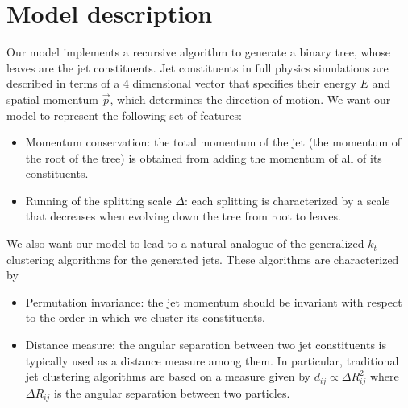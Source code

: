 \documentclass[12pt]{article}
\begin{document}
\vspace{0.6cm}
\section{Model description}

Our model implements a recursive algorithm to generate a binary tree, whose leaves are the jet constituents. Jet constituents in full physics simulations are described in terms of a 4 dimensional vector that specifies their energy $E$ and spatial momentum $\vec{p}$, which determines the direction of motion. 
We want our model to represent the following set of features:
\begin{itemize}
\item Momentum conservation: the total momentum of the jet (the momentum of the root of the tree) is obtained from adding the momentum of all of its constituents.

\item Running of the splitting scale $\Delta$: each splitting is characterized by a scale that decreases when evolving down the tree from root to leaves.





\end{itemize}

We also want our model to lead to a natural analogue of the generalized $k_t$ clustering algorithms for the generated jets. These algorithms are characterized by

\begin{itemize}
\item Permutation invariance: the jet momentum should be invariant with respect to the order in which we cluster its constituents.

\item Distance measure: the angular separation between two jet constituents is typically used as a distance measure among them. In particular, traditional jet clustering algorithms are based on a measure given by 
$d_{ij} \propto  \Delta R_{ij}^2$
where $\Delta R_{ij}$ is the angular separation between two particles.

\end{itemize} 
\end{document}
